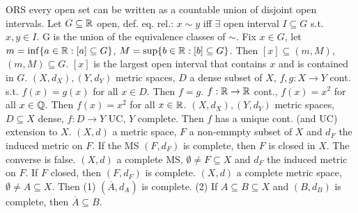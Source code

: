  ORS every open set can be written as a countable union of disjoint open intervals.
Let $G \subseteq \mathbb{R}$ open,
def. eq. rel.: $x \sim y$ iff $\exists$ open interval $I \subseteq G$ s.t. $x,y \in I$.
G is the union of the equivalence classes of $\sim$.
Fix $x \in G$, let $m = \inf \{a \in \mathbb{R} : [a] \subseteq G\}$,
$M = \sup \{b \in \mathbb{R} : [b] \subseteq G\}$.
Then
$[x] \subseteq (m,M)$,
$(m,M) \subseteq G$.
 $[x]$ is the largest open interval that contains $x$ and is contained in $G$.
 $(X, d_X), (Y, d_Y)$ metric spaces, $D$ a dense subset of $X$,
$f, g: X \to Y$ cont. s.t. $f(x) = g(x)$ for all $x \in D$.
Then $f = g$.
 $f: \mathbb{R} \to \mathbb{R}$ cont., $f(x) = x^2$ for all $x \in \mathbb{Q}$.
Then $f(x) = x^2$ for all $x \in \mathbb{R}$.
 $(X, d_X), (Y, d_Y)$ metric spaces, $D \subseteq X$ dense,
$f: D \to Y$ UC, $Y$ complete.
Then $f$ has a unique cont. (and UC) extension to $X$.
 $(X,d)$ a metric space, $F$ a non-emmpty subset of $X$ and $d_F$ the induced metric on $F$.
If the MS $(F, d_F)$ is complete, then $F$ is closed in $X$.
The converse is false.
 $(X,d)$ a complete MS, $\emptyset \neq F \subseteq X$ and $d_F$ the induced metric on $F$.
If $F$ closed, then $(F, d_F)$ is complete.
 $(X,d)$ a complete metric space, $\emptyset \neq A \subseteq X$. Then
(1) $(\overline{A}, d_A)$ is complete.
(2) If $A \subseteq B \subseteq X$ and $(B, d_B)$ is complete, then $\overline{A} \subseteq B$.
